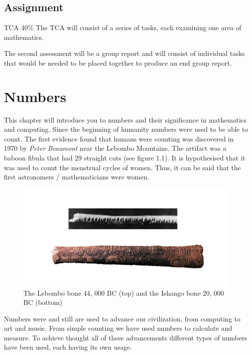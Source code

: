\documentclass[
]{book}
\begin{document}
\hypertarget{assignment}{%
\section*{Assignment}\label{assignment}}

TCA 40\%
The TCA will consist of a series of tasks, each examining one area of mathematics.

The second assessment will be a group report and will consist of individual tasks that would be needed to be placed together to produce an end group report.

\hypertarget{numbers}{%
\chapter{Numbers}\label{numbers}}

This chapter will introduce you to numbers and their significance in mathematics and computing.
Since the beginning of humanity numbers were used to be able to count. The first evidence found that humans were counting was discovered in 1970 by \emph{Peter Beaumont} near the Lebombo Mountains. The artifact was a baboon fibula that had 29 straight cuts (see figure 1.1). It is hypothesised that it was used to count the menstrual cycles of women. Thus, it can be said that the first astronomers / mathematicians were women.

\begin{figure}

{\centering \includegraphics[width=1\linewidth]{images/Lebombo-bone} 

}

\caption{The Lebombo bone 44, 000 BC (top) and the Ishango bone 20, 000 BC (bottom)}\label{fig:unnamed-chunk-2}
\end{figure}

Numbers were and still are used to advance our civilization, from computing to art and music. From simple counting we have used numbers to calculate and measure. To achieve thought all of these advancements different types of numbers have been used, each having its own usage.
\end{document}
